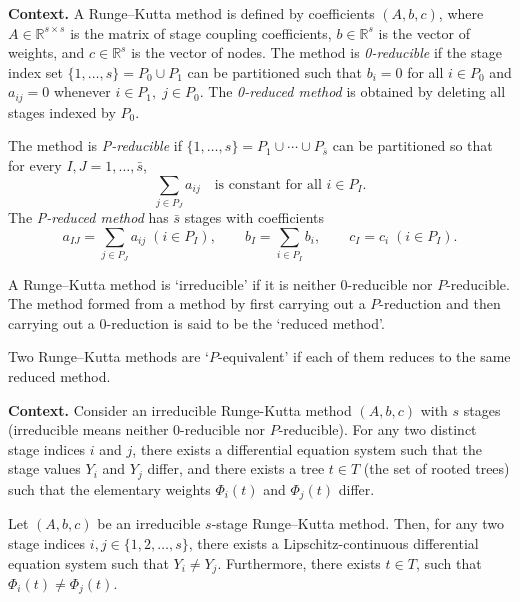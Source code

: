 \noindent\textbf{Context.}
A Runge--Kutta method is defined by coefficients $(A,b,c)$, where $A\in\mathbb{R}^{s\times s}$ is the matrix of stage coupling coefficients, $b\in\mathbb{R}^{s}$ is the vector of weights, and $c\in\mathbb{R}^{s}$ is the vector of nodes.  
The method is \emph{0-reducible} if the stage index set $\{1,\dots,s\}=P_{0}\cup P_{1}$ can be partitioned such that $b_i=0$ for all $i\in P_{0}$ and $a_{ij}=0$ whenever $i\in P_{1},\;j\in P_{0}$.  
The \emph{0-reduced method} is obtained by deleting all stages indexed by $P_{0}$.  

The method is \emph{P-reducible} if $\{1,\dots,s\}=P_{1}\cup\cdots\cup P_{\bar{s}}$ can be partitioned so that for every $I,J=1,\dots,\bar{s}$,
\[
\sum_{j\in P_{J}} a_{ij} \quad \text{is constant for all } i\in P_{I}.
\]
The \emph{P-reduced method} has $\bar{s}$ stages with coefficients
\[
a_{IJ}= \sum_{j\in P_{J}} a_{ij}\;(i\in P_{I}),\qquad
b_{I}= \sum_{i\in P_{I}} b_{i},\qquad
c_{I}= c_{i}\;(i\in P_{I}).
\]

\begin{definition}

  \label{def:381E}
A Runge--Kutta method is `irreducible' if it is neither $0$-reducible nor $P$-reducible. The method formed from a method by first carrying out a $P$-reduction and then carrying out a $0$-reduction is said to be the `reduced method'.
\end{definition}

\begin{definition}[P -equivalent (381F)]

  \label{def:381F}
Two Runge--Kutta methods are `$P$-equivalent' if each of them reduces to the same reduced method.
\end{definition}

\noindent\textbf{Context.}
Consider an irreducible Runge-Kutta method \((A,b,c)\) with \(s\) stages (irreducible means neither 0-reducible nor \(P\)-reducible). For any two distinct stage indices \(i\) and \(j\), there exists a differential equation system such that the stage values \(Y_i\) and \(Y_j\) differ, and there exists a tree \(t \in T\) (the set of rooted trees) such that the elementary weights \(\Phi_i(t)\) and \(\Phi_j(t)\) differ.

\begin{theorem}

  \label{thm:381G}
Let $(A, b, c)$ be an irreducible $s$-stage Runge--Kutta method.
Then, for any two stage indices $i, j \in \{1, 2, \dots, s\}$, there exists a Lipschitz-continuous differential equation system such that $Y_i \neq Y_j$. Furthermore, there exists $t \in T$, such that $\Phi_i(t) \neq \Phi_j(t)$.
\end{theorem}

